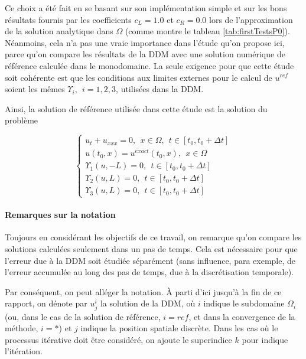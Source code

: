 \indent Ce choix a été fait en se basant sur son implémentation simple et sur les bons résultats fournis par les coefficients $c_L = 1.0$ et $c_R = 0.0$ lors de l'approximation de la solution analytique dans $\Omega$ (comme montre le tableau \ref{tab:firstTestsP0}). Néanmoins, cela n'a pas une vraie importance dans l'étude qu'on propose ici, parce qu'on compare les résultats de la DDM avec une solution numérique de référence calculée  dans le monodomaine. La seule exigence pour que cette étude soit cohérente est que les conditions aux limites externes pour le calcul de $u^{ref}$ soient les mêmes $\Upsilon_i, \ \ i=1,2,3$, utilisées dans la DDM.

\indent Ainsi, la solution de référence utilisée dans cette étude est la solution du problème

\begin{equation}
	\label{eq:problemMonodomain}
	\begin{cases}
	u_t + u_{xxx} = 0, \ \ x \in \Omega, \ \ t \in [t_0, t_0+\Delta t] \\
	u(t_0,x) = u^{exact}(t_0,x) , \ \ x \in \Omega \\ 
	\Upsilon_1(u,-L) = 0, \ \ t \in [t_0, t_0+\Delta t] \\
	\Upsilon_2(u,L) = 0, \ \ t \in [t_0, t_0+\Delta t] \\
	\Upsilon_3(u,L) = 0, \ \ t \in [t_0, t_0+\Delta t]
	\end{cases}
\end{equation}


\paragraph{Remarques sur la notation}

\indent Toujours en considérant les objectifs de ce travail, on remarque qu'on compare les solutions calculées seulement dans un pas de temps. Cela est nécessaire pour que l'erreur due à la DDM soit étudiée séparément (sans influence, para exemple, de l'erreur accumulée au long des pas de temps, due à la discrétisation temporale).

\indent Par conséquent, on peut alléger la notation. À parti d'ici jusqu'à la fin de ce rapport, on dénote par $u_j^i$ la solution de la DDM, où $i$ indique le subdomaine $\Omega_i$ (ou, dans le cas de la solution de référence, $i=ref$, et dans la convergence de la méthode, $i=*$) et $j$ indique la position spatiale discrète. Dans les cas où le processus itérative doit être considéré, on ajoute le superindice $k$ pour indique l'itération.

